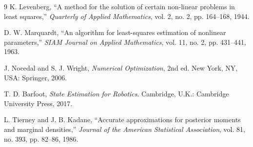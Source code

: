 \documentclass[11pt]{article}
\begin{document}
\begin{thebibliography}{9}
K. Levenberg, ``A method for the solution of certain non-linear problems in
least squares,'' \emph{Quarterly of Applied Mathematics}, vol. 2, no. 2,
pp. 164--168, 1944.

D. W. Marquardt, ``An algorithm for least-squares estimation of nonlinear
parameters,'' \emph{SIAM Journal on Applied Mathematics}, vol. 11, no. 2,
pp. 431--441, 1963.

J. Nocedal and S. J. Wright, \emph{Numerical Optimization}, 2nd ed. New York,
NY, USA: Springer, 2006.

T. D. Barfoot, \emph{State Estimation for Robotics}. Cambridge, U.K.:
Cambridge University Press, 2017.

L. Tierney and J. B. Kadane, ``Accurate approximations for posterior moments
and marginal densities,'' \emph{Journal of the American Statistical
Association}, vol. 81, no. 393, pp. 82--86, 1986.
\end{thebibliography}
\end{document}

